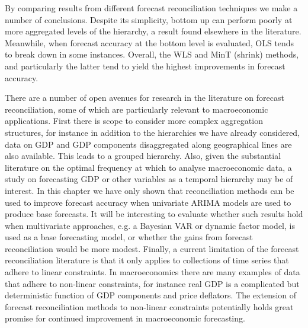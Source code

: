 \documentclass[graybox]{svmult}
\begin{document}
By comparing results from different forecast reconciliation techniques we make a number of conclusions.  Despite its simplicity, bottom up can perform poorly at more aggregated levels of the hierarchy, a result found elsewhere in the literature. Meanwhile, when forecast accuracy at the bottom level is evaluated, OLS tends to break down in some instances.  Overall, the WLS and MinT (shrink) methods, and particularly the latter tend to yield the highest improvements in forecast accuracy.  

There are a number of open avenues for research in the literature on forecast reconciliation, some of which are particularly relevant to macroeconomic applications.  First there is scope to consider more complex aggregation structures, for instance in addition to the hierarchies we have already considered, data on GDP and GDP components disaggregated along geographical lines are also available.  This leads to a grouped hierarchy.  Also, given the substantial literature on the optimal frequency at which to analyse macroeconomic data, a study on forecasting GDP or other variables as a temporal hierarchy may be of interest.  In this chapter we have only shown that reconciliation methods can be used to improve forecast accuracy when univariate ARIMA models are used to produce base forecasts.  It will be interesting to evaluate whether such results hold when multivariate approaches, e.g. a Bayesian VAR or dynamic factor model, is used as a base forecasting model, or whether the gains from forecast reconciliation would be more modest.  Finally, a current limitation of the forecast reconciliation literature is that it only applies to collections of time series that adhere to linear constraints.  In macroeconomics there are many examples of data that adhere to non-linear constraints, for instance real GDP is a complicated but deterministic function of GDP components and price deflators.  The extension of forecast reconciliation methods to non-linear constraints potentially holds great promise for continued improvement in macroeconomic forecasting.
\end{document}
